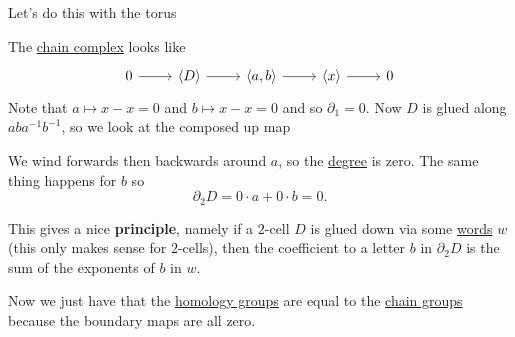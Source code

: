 \begin{eg}
	Let's do this with the torus
	\begin{figure}[H]
		\centering
		\label{fig:eg:lec31:CW-complex-torus}
	\end{figure}

	The \hyperref[def:cellular-chain-complex]{chain complex} looks like
	\[
		\begin{tikzcd}
			0 & {\left<D\right>} & {\left<a, b\right>} & {\left<x\right>} & 0
			\arrow[from=1-1, to=1-2]
			\arrow[from=1-2, to=1-3]
			\arrow[from=1-3, to=1-4]
			\arrow[from=1-4, to=1-5]
		\end{tikzcd}
	\]
	Note that \(a \mapsto x - x = 0\) and \(b \mapsto x - x = 0\) and so \(\partial_1 = 0\). Now \(D\) is glued along \(aba^{-1}b^{-1}\), so we look at the composed up map

	\begin{figure}[H]
		\centering
		\label{fig:eg:cellular-homology-calc-torus}
	\end{figure}
	We wind forwards then backwards around $a$, so the \hyperref[def:degree]{degree} is zero. The same thing happens for $b$ so
	\[
		\partial_2 D = 0 \cdot a + 0 \cdot b = 0.
	\]

	This gives a nice \textbf{principle}, namely if a \(2\)-cell \(D\) is glued down via some \hyperref[def:word]{words} \(w\) (this only makes sense for \(2\)-cells), then the
	coefficient to a letter \(b\) in \(\partial_2 D\) is the sum of the exponents of \(b\) in \(w\).

	Now we just have that the \hyperref[def:cellular-homology-group]{homology groups} are equal to the \hyperref[def:cellular-chain-complex]{chain groups} because the boundary maps are all zero.
\end{eg}


